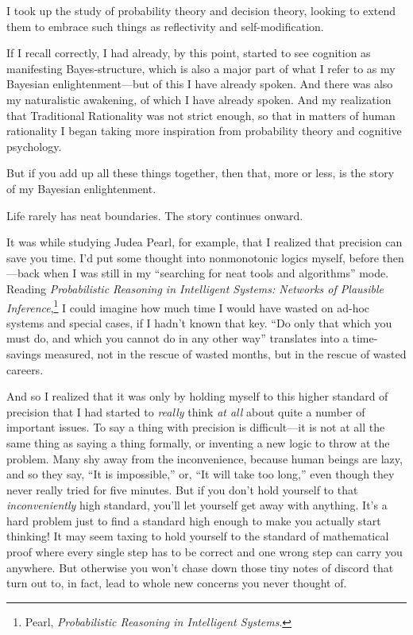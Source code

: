 {
 I took up the study of probability theory and decision theory,
looking to extend them to embrace such things as reflectivity and
self-modification.}

{
 If I recall correctly, I had already, by this point, started to
see cognition as manifesting Bayes-structure, which is also a major
part of what I refer to as my Bayesian enlightenment---but of this I
have already spoken. And there was also my naturalistic awakening, of
which I have already spoken. And my realization that Traditional
Rationality was not strict enough, so that in matters of human
rationality I began taking more inspiration from probability theory and
cognitive psychology.}

{
 But if you add up all these things together, then that, more or
less, is the story of my Bayesian enlightenment.}

{
 Life rarely has neat boundaries. The story continues onward.}

{
 It was while studying Judea Pearl, for example, that I realized
that precision can save you time. I'd put some thought
into nonmonotonic logics myself, before then---back when I was still in
my ``searching for neat tools and
algorithms'' mode. Reading \textit{Probabilistic
Reasoning in Intelligent Systems: Networks of Plausible
Inference},\footnote{Pearl, \textit{Probabilistic Reasoning in Intelligent
Systems}.} I could imagine how much time I would
have wasted on ad-hoc systems and special cases, if I
hadn't known that key. ``Do only that
which you must do, and which you cannot do in any other
way'' translates into a time-savings measured, not in
the rescue of wasted months, but in the rescue of wasted careers.}

{
 And so I realized that it was only by holding myself to this
higher standard of precision that I had started to \textit{really}
think \textit{at all} about quite a number of important issues. To say
a thing with precision is difficult---it is not at all the same thing
as saying a thing formally, or inventing a new logic to throw at the
problem. Many shy away from the inconvenience, because human beings are
lazy, and so they say, ``It is
impossible,'' or, ``It will take too
long,'' even though they never really tried for five
minutes. But if you don't hold yourself to that
\textit{inconveniently} high standard, you'll let
yourself get away with anything. It's a hard problem
just to find a standard high enough to make you actually start
thinking! It may seem taxing to hold yourself to the standard of
mathematical proof where every single step has to be correct and one
wrong step can carry you anywhere. But otherwise you
won't chase down those tiny notes of discord that turn
out to, in fact, lead to whole new concerns you never thought of.}

